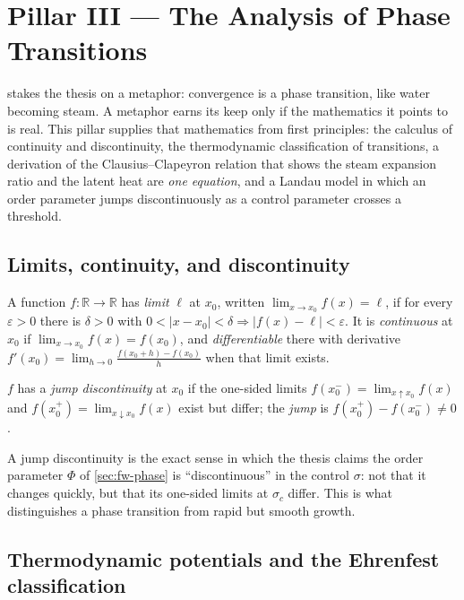 \section{Pillar III --- The Analysis of Phase Transitions}
\label{sec:analysis}

 stakes the thesis on a metaphor: convergence is a phase
transition, like water becoming steam. A metaphor earns its keep only if the
mathematics it points to is real. This pillar supplies that mathematics from first
principles: the calculus of continuity and discontinuity, the thermodynamic
classification of transitions, a derivation of the Clausius--Clapeyron relation
that shows the steam expansion ratio and the latent heat are \emph{one equation},
and a Landau model in which an order parameter jumps discontinuously as a control
parameter crosses a threshold.

\subsection{Limits, continuity, and discontinuity}
\label{sec:an-limits}

\begin{definition}
A function $f\colon\mathbb R\to\mathbb R$ has \emph{limit} $\ell$ at $x_0$, written
$\lim_{x\to x_0}f(x)=\ell$, if for every $\varepsilon>0$ there is $\delta>0$ with
$0<|x-x_0|<\delta\Rightarrow|f(x)-\ell|<\varepsilon$. It is \emph{continuous} at
$x_0$ if $\lim_{x\to x_0}f(x)=f(x_0)$, and \emph{differentiable} there with
derivative $f'(x_0)=\lim_{h\to0}\frac{f(x_0+h)-f(x_0)}{h}$ when that limit exists.
\end{definition}

\begin{definition}
$f$ has a \emph{jump discontinuity} at $x_0$ if the one-sided limits
$f(x_0^-)=\lim_{x\uparrow x_0}f(x)$ and $f(x_0^+)=\lim_{x\downarrow x_0}f(x)$ exist
but differ; the \emph{jump} is $f(x_0^+)-f(x_0^-)\ne 0$.
\end{definition}

A jump discontinuity is the exact sense in which the thesis claims the order
parameter $\Phi$ of \cref{sec:fw-phase} is ``discontinuous'' in the control
$\sigma$: not that it changes quickly, but that its one-sided limits at $\sigma_c$
differ. This is what distinguishes a phase transition from rapid but smooth growth.

\subsection{Thermodynamic potentials and the Ehrenfest classification}
\label{sec:an-thermo}

